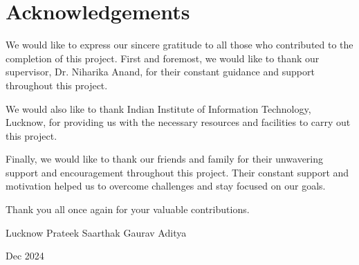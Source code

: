 \chapter*{Acknowledgements}

We would like to express our sincere gratitude to all those who contributed
to the completion of this project. First and foremost, we would like to
thank our supervisor, Dr. Niharika Anand, for their constant guidance
and support throughout this project.

We would also like to thank Indian Institute of Information Technology, Lucknow, for providing us with the necessary resources and facilities to carry out this project.

Finally, we would like to thank our friends and family for their unwavering support and encouragement throughout this project. Their constant support and motivation helped us to overcome challenges and stay focused on our goals.

Thank you all once again for your valuable contributions.

\vspace{3cm}

\noindent Lucknow \hfill Prateek
\noindent \hfill Saarthak
\noindent \hfill Gaurav
\noindent \hfill Aditya

\noindent Dec 2024